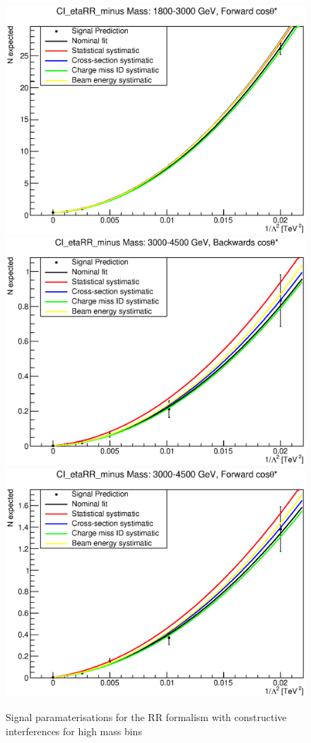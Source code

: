 \begin{figure}[ht]
			\includegraphics[width=0.49\linewidth]{images/thesis_fits/CI_2D_etaRR_minus_Mass_1800-3000_GeV_CTS_0_1.eps}
			\includegraphics[width=0.49\linewidth]{images/thesis_fits/CI_2D_etaRR_minus_Mass_3000-4500_GeV_CTS_-1_0.eps}
			\includegraphics[width=0.49\linewidth]{images/thesis_fits/CI_2D_etaRR_minus_Mass_3000-4500_GeV_CTS_0_1.eps}
		\caption{Signal paramaterisations for the RR formalism with constructive interferences for high mass bins}
		\label{fig:parm_RR_m_2}
	\end{figure}



